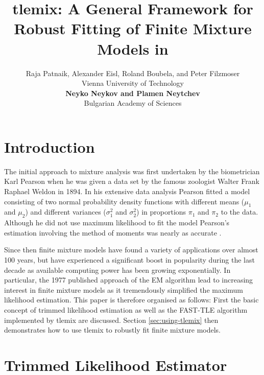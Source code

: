\documentclass[article,shortnames,nojss]{jss}
\title{tlemix: A General Framework for Robust Fitting of Finite Mixture Models in \proglang{R}}
\author{Raja Patnaik, Alexander Eisl, Roland Boubela, and Peter Filzmoser\\Vienna University of Technology\\[2mm]
{\large \bf Neyko Neykov and Plamen Neytchev}\\Bulgarian Academy of Sciences}
\newcommand{\R}{\proglang{R}}
\begin{document}
\section{Introduction}
\label{sec:introduction}

The initial approach to mixture analysis was first undertaken by the biometrician Karl Pearson when he was given a data set by the famous zoologist Walter Frank Raphael Weldon in 1894. In his extensive data analysis Pearson fitted a model consisting of two normal probability density functions with different means ($\mu_1$ and $\mu_2$) and different variances ($\sigma_1^2$ and $\sigma_2^2$) in proportions $\pi_1$ and $\pi_2$ to the data. Although he did not use maximum likelihood to fit the model Pearson's estimation involving the method of moments was nearly as accurate \citep[see][]{MP2000}.

Since then finite mixture models have found a variety of applications over almost 100 years, but have experienced a significant boost in popularity during the last decade as available computing power has been growing exponentially. In particular, the 1977 published approach of the EM algorithm lead to increasing interest in finite mixture models as it tremendously simplified the maximum likelihood estimation. This paper is therefore organised as follows: First the basic concept of trimmed likelihood estimation as well as the FAST-TLE algorithm implemented by tlemix are discussed. Section \ref{sec:using-tlemix} then demonstrates how to use tlemix to robustly fit finite mixture models.


\section{Trimmed Likelihood Estimator}
\label{sec:tle}
\end{document}
